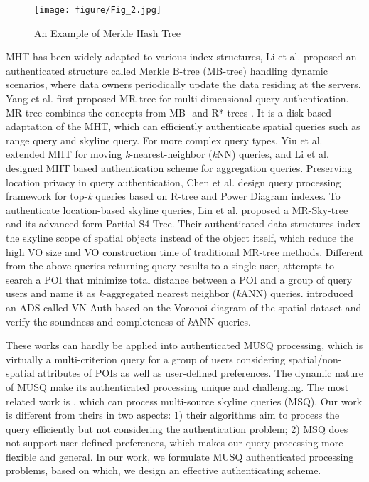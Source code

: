 \documentclass[10pt, conference, compsocconf]{IEEEtran}
\begin{document}
\begin{figure}[H]
	\centering
	\texttt{[image: figure/Fig\_2.jpg]}
	\caption{An Example of Merkle Hash Tree}\label{MHTexample}
\end{figure}

MHT has been widely adapted to various index structures, Li et al. \cite{SIGMOD2006} proposed an authenticated structure called Merkle B-tree (MB-tree) handling dynamic scenarios, where data owners periodically update the data residing at the servers. Yang et al. \cite{VLDB2009b,ICDE2008} first proposed MR-tree for multi-dimensional query authentication. MR-tree combines the concepts from MB- and R*-trees \cite{beckmann1990r}. It is a disk-based adaptation of the MHT, which can efficiently authenticate spatial queries such as range query and skyline query. For more complex query types, Yiu et al. \cite{ICDE2011} extended MHT for moving \emph{k}-nearest-neighbor (\emph{k}NN) queries, and Li et al. \cite{TISSEC2010} designed MHT based authentication scheme for aggregation queries. Preserving location privacy in query authentication, Chen et al. \cite{chen2014authenticating} design query processing framework for top-\emph{k} queries based on R-tree and Power Diagram indexes. To authenticate location-based skyline queries, Lin et al. \cite{lin2011authentication, lin2014authenticating} proposed a MR-Sky-tree and its advanced form Partial-S4-Tree. Their authenticated data structures index the skyline scope of spatial objects instead of the object itself, which reduce the high VO size and VO construction time of traditional MR-tree methods. Different from the above queries returning query results to a single user, \cite{papadias2005aggregate} attempts to search a POI that minimize total distance between a POI and a group of query users and name it as \emph{k}-aggregated nearest neighbor (\emph{k}ANN) queries. \cite{hu2013spatial} introduced an ADS called VN-Auth based on the Voronoi diagram of the spatial dataset and verify the soundness and completeness of \emph{k}ANN queries.

These works can hardly be applied into authenticated MUSQ processing, which is virtually a multi-criterion query for a group of users considering spatial/non-spatial attributes of POIs as well as user-defined preferences. The dynamic nature of MUSQ make its authenticated processing unique and challenging. The most related work is \cite{deng2007multi, geng2012spatial}, which can process multi-source skyline queries (MSQ). Our work is different from theirs in two aspects: 1) their algorithms aim to process the query efficiently but not considering the authentication problem; 2) MSQ does not support user-defined preferences, which makes our query processing more flexible and general. In our work, we formulate MUSQ authenticated processing problems, based on which, we design an effective authenticating scheme.
\end{document}
